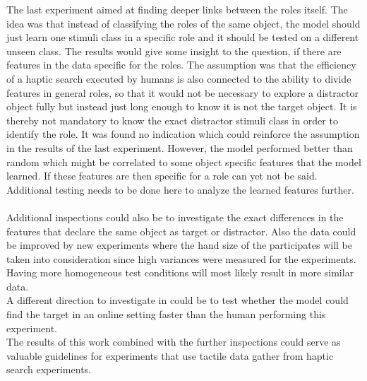 The last experiment aimed at finding deeper links between the roles itself. The idea was that instead of classifying the roles of the same object, the model should just learn one stimuli class in a specific role and it should be tested on a different unseen class. The results would give some insight to the question, if there are features in the data specific for the roles. The assumption was that the efficiency of a haptic search executed by humans is also connected to the ability to divide features in general roles, so that it would not be necessary to explore a distractor object fully but instead just long enough to know it is not the target object. It is thereby not mandatory to know the exact distractor stimuli class in order to identify the role. It was found no indication which could reinforce the assumption in the results of the last experiment. However, the model performed better than random which might be correlated to some object specific features that the model learned. If these features are then specific for a role can yet not be said. Additional testing needs to be done here to analyze the learned features further.\\
\\

Additional inspections could also be to investigate the exact differences in the features that declare the same object as target or distractor. Also the data could be improved by new experiments where the hand size of the participates will be taken into consideration since high variances were measured for the experiments. Having more homogeneous test conditions will most likely result in more similar data. \\
A different direction to investigate in could be to test whether the model could find the target in an online setting faster than the human performing this experiment. \\
The results of this work combined with the further inspections could serve as valuable guidelines for experiments that use tactile data gather from haptic search experiments.